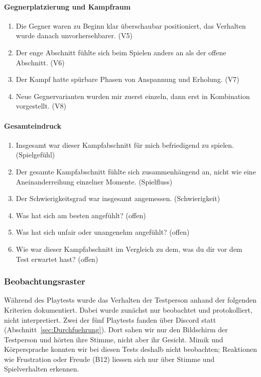 \documentclass[../Main.tex]{subfiles}
\begin{document}
\paragraph{Gegnerplatzierung und Kampfraum}
\begin{enumerate}[label=\textbf{Q\arabic*}, leftmargin=1.5cm, itemsep=0.5em, resume]
    \item Die Gegner waren zu Beginn klar überschaubar positioniert, das Verhalten wurde danach unvorhersehbarer. \hfill (V5)
    \item Der enge Abschnitt fühlte sich beim Spielen anders an als der offene Abschnitt. \hfill (V6)
    \item Der Kampf hatte spürbare Phasen von Anspannung und Erholung. \hfill (V7)
    \item Neue Gegnervarianten wurden mir zuerst einzeln, dann erst in Kombination vorgestellt. \hfill (V8)
\end{enumerate}

\paragraph{Gesamteindruck}
\begin{enumerate}[label=\textbf{Q\arabic*}, leftmargin=1.5cm, itemsep=0.5em, resume]
    \item Insgesamt war dieser Kampfabschnitt für mich befriedigend zu spielen. \hfill (Spielgefühl)
    \item Der gesamte Kampfabschnitt fühlte sich zusammenhängend an, nicht wie eine Aneinanderreihung einzelner Momente. \hfill (Spielfluss)
    \item Der Schwierigkeitsgrad war insgesamt angemessen. \hfill (Schwierigkeit)
    \item Was hat sich am besten angefühlt? \hfill (offen)
    \item Was hat sich unfair oder unangenehm angefühlt? \hfill (offen)
    \item Wie war dieser Kampfabschnitt im Vergleich zu dem, was du dir vor dem Test erwartet hast? \hfill (offen)
\end{enumerate}

\subsubsection{Beobachtungsraster} \label{sec:Beobachtungsraster}

Während des Playtests wurde das Verhalten der Testperson anhand der folgenden Kriterien dokumentiert. Dabei wurde zunächst nur beobachtet und protokolliert, nicht interpretiert. Zwei der fünf Playtests fanden über Discord statt (Abschnitt~\ref{sec:Durchfuehrung}). Dort sahen wir nur den Bildschirm der Testperson und hörten ihre Stimme, nicht aber ihr Gesicht. Mimik und Körpersprache konnten wir bei diesen Tests deshalb nicht beobachten; Reaktionen wie Frustration oder Freude (B12) liessen sich nur über Stimme und Spielverhalten erkennen.
\end{document}
